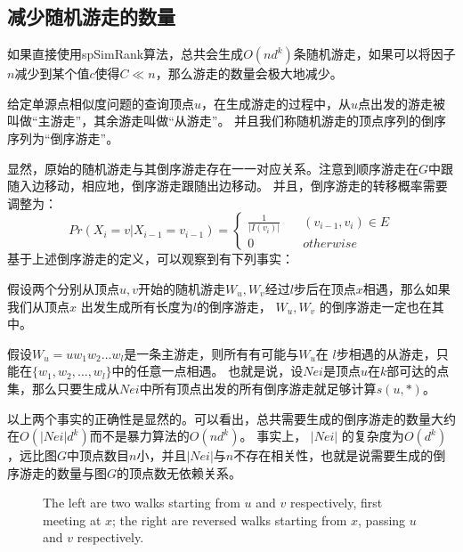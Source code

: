 \documentclass[master]{njuthesis}
\begin{document}
\subsection{减少随机游走的数量}
如果直接使用spSimRank算法，总共会生成$O(nd^k)$条随机游走，如果可以将因子$n$减少到某个值$c$使得$C \ll n$，那么游走的数量会极大地减少。
\begin{definition}[倒序游走]
 给定单源点相似度问题的查询顶点$u$，在生成游走的过程中，从$u$点出发的游走被叫做“主游走”，其余游走叫做“从游走”。 
 并且我们称随机游走的顶点序列的倒序序列为“倒序游走”。
\end{definition}
显然，原始的随机游走与其倒序游走存在一一对应关系。注意到顺序游走在$G$中跟随入边移动，相应地，倒序游走跟随出边移动。
并且，倒序游走的转移概率需要调整为：
\begin{equation}
Pr(X_i=v|X_{i-1}=v_{i-1}) = \left\{
        \begin{array}{ll}
	\frac{1}{|I(v_{i})|} & \quad (v_{i-1}, v_i) \in E \\
	0  &\quad otherwise
        \end{array}
    \right.
	\label{eq:eight}
\end{equation}
基于上述倒序游走的定义，可以观察到有下列事实：
\begin{fact}
假设两个分别从顶点$u, v$开始的随机游走$W_u, W_v$经过$l$步后在顶点$x$相遇，那么如果我们从顶点$x$ 出发生成所有长度为$l$的倒序游走，
$W_u, W_v$ 的倒序游走一定也在其中。
\end{fact}
\begin{fact}
 假设$W_u=uw_1w_2\dots w_l$是一条主游走，则所有有可能与$W_u$在 $l$步相遇的从游走，只能在$\{w_1, w_2, \dots, w_l\}$中的任意一点相遇。
 也就是说，设$Nei$是顶点$u$在$k$部可达的点集，那么只要生成从$Nei$中所有顶点出发的所有倒序游走就足够计算$s(u,*)$。
\end{fact}
以上两个事实的正确性是显然的。可以看出，总共需要生成的倒序游走的数量大约在$O(|Nei|d^k)$而不是暴力算法的$O(nd^k)$。
事实上， $|Nei|$ 的复杂度为$O(d^k)$，远比图$G$中顶点数目$n$小，并且$|Nei|$与$n$不存在相关性，也就是说需要生成的倒序游走的数量与图$G$的顶点数无依赖关系。
\iffalse
\begin{figure}[h]
\centering
\label{fig:graph1}
\resizebox{!}{!}{}
\caption{The left are two walks starting from $u$ and $v$ respectively, first meeting at $x$; the right are reversed walks starting from $x$, passing $u$ and $v$ respectively.}\label{fig:one}
\end{figure}
\end{document}
